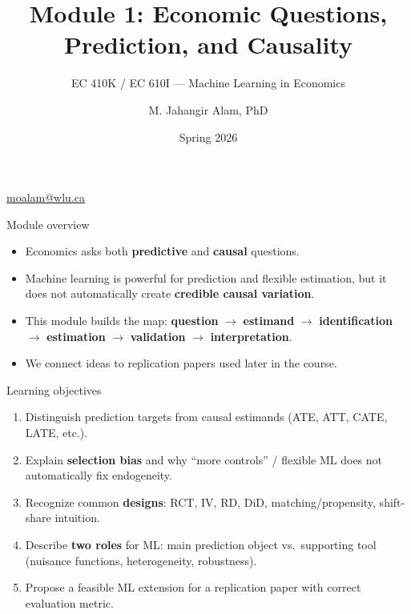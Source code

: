 \documentclass[aspectratio=169,11pt]{beamer}
\title[Prediction \& Causality]{Module 1: Economic Questions, Prediction, and Causality}
\subtitle{EC 410K / EC 610I --- Machine Learning in Economics}
\author{M. Jahangir Alam, PhD}
\institute{Wilfrid Laurier University}
\date{Spring 2026}
\begin{document}
\begin{frame}[plain]
  \titlepage
  \vspace{-0.5em}
  \begin{center}
    \small \href{mailto:moalam@wlu.ca}{moalam@wlu.ca}
  \end{center}
\end{frame}

\begin{frame}{Module overview}
  \begin{itemize}
    \item Economics asks both \textbf{predictive} and \textbf{causal} questions.
    \item Machine learning is powerful for prediction and flexible estimation, but it does not automatically create \textbf{credible causal variation}.
    \item This module builds the map: \textbf{question} $\rightarrow$ \textbf{estimand} $\rightarrow$ \textbf{identification} $\rightarrow$ \textbf{estimation} $\rightarrow$ \textbf{validation} $\rightarrow$ \textbf{interpretation}.
    \item We connect ideas to replication papers used later in the course.
  \end{itemize}
\end{frame}

\begin{frame}{Learning objectives}
  \begin{enumerate}
    \item Distinguish prediction targets from causal estimands (ATE, ATT, CATE, LATE, etc.).
    \item Explain \textbf{selection bias} and why ``more controls'' / flexible ML does not automatically fix endogeneity.
    \item Recognize common \textbf{designs}: RCT, IV, RD, DiD, matching/propensity, shift-share intuition.
    \item Describe \textbf{two roles} for ML: main prediction object vs.\ supporting tool (nuisance functions, heterogeneity, robustness).
    \item Propose a feasible ML extension for a replication paper with correct evaluation metric.
  \end{enumerate}
\end{frame}
\end{document}
